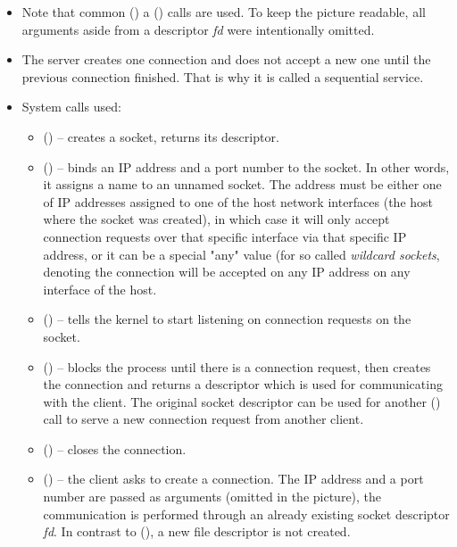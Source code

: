 \begin{itemize}
\item Note that common () a () calls are used.  To
keep the picture readable, all arguments aside from a descriptor \emph{fd} were
intentionally omitted.
\item The server creates one connection and does not accept a new one until the
previous connection finished.  That is why it is called a sequential service.
\item System calls used:
\begin{itemize}
\item {}() -- creates a socket, returns its descriptor.

\item {}() -- binds an IP address and a port number to the socket.
In other words, it assigns a name to an unnamed socket.  The address must be
either one of IP addresses assigned to one of the host network interfaces (the
host where the socket was created), in which case it will only accept connection
requests over that specific interface via that specific IP address, or it can be
a special "any" value (for so called \emph{wildcard sockets},
denoting the connection will be accepted on any IP address on any interface of
the host.
\item {}() -- tells the kernel to start listening on connection
requests on the socket.
\item {}() -- blocks the process until there is a connection
request, then creates the connection and returns a  descriptor which
is used for communicating with the client.  The original socket descriptor can
be used for another () call to serve a new connection request from
another client.
\item {}() -- closes the connection.
\item {}() -- the client asks to create a connection.  The IP
address and a port number are passed as arguments (omitted in the picture), the
communication is performed through an already existing socket descriptor
\emph{fd}.  In contrast to (), a new file descriptor is not
created.
\end{itemize}
\end{itemize}



